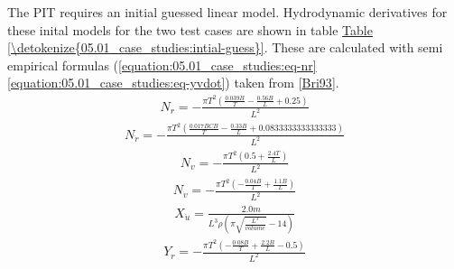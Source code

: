 \documentclass[review]{elsarticle}
\begin{document}
\sphinxAtStartPar
The PIT requires an initial guessed linear model. Hydrodynamic derivatives for these inital models for the two test cases are shown in table \hyperref[\detokenize{05.01_case_studies:intial-guess}]{Table \ref{\detokenize{05.01_case_studies:intial-guess}}}. These are calculated with semi empirical formulas (\autoref{equation:05.01_case_studies:eq-nr}\sphinxhyphen{} \autoref{equation:05.01_case_studies:eq-yvdot}) taken from {[}\hyperlink{cite.bibligraphy:id45}{Bri93}{]}.
\begin{equation}\label{equation:05.01_case_studies:eq_Nr}
\begin{split}\displaystyle N_{r} = - \frac{\pi T^{2} \left(\frac{0.039 B}{T} - \frac{0.56 B}{L} + 0.25\right)}{L^{2}}\end{split}
\end{equation}\begin{equation}\label{equation:05.01_case_studies:eq_Nrdot}
\begin{split}\displaystyle N_{\dot{r}} = - \frac{\pi T^{2} \left(\frac{0.017 B CB}{T} - \frac{0.33 B}{L} + 0.0833333333333333\right)}{L^{2}}\end{split}
\end{equation}\begin{equation}\label{equation:05.01_case_studies:eq_Nv}
\begin{split}\displaystyle N_{v} = - \frac{\pi T^{2} \left(0.5 + \frac{2.4 T}{L}\right)}{L^{2}}\end{split}
\end{equation}\begin{equation}\label{equation:05.01_case_studies:eq_Nvdot}
\begin{split}\displaystyle N_{\dot{v}} = - \frac{\pi T^{2} \left(- \frac{0.04 B}{T} + \frac{1.1 B}{L}\right)}{L^{2}}\end{split}
\end{equation}\begin{equation}\label{equation:05.01_case_studies:eq_Xudot}
\begin{split}\displaystyle X_{\dot{u}} = \frac{2.0 m}{L^{3} \rho \left(\pi \sqrt{\frac{L^{3}}{volume}} - 14\right)}\end{split}
\end{equation}\begin{equation}\label{equation:05.01_case_studies:eq_Yr}
\begin{split}\displaystyle Y_{r} = - \frac{\pi T^{2} \left(- \frac{0.08 B}{T} + \frac{2.2 B}{L} - 0.5\right)}{L^{2}}\end{split}

\end{equation}
\end{document}
